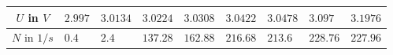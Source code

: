 \begin{tabular}{c|*{8}{*{1}{l}}}
$U$ in $\si{V}$ & $2.997$ & $3.0134$ & $3.0224$ & $3.0308$ & $3.0422$ & $3.0478$ & $3.097$ & $3.1976$ \\ \hline
$N$ in $\si{1/s}$ & $0.4$ & $2.4$ & $137.28$ & $162.88$ & $216.68$ & $213.6$ & $228.76$ & $227.96$\end{tabular}
